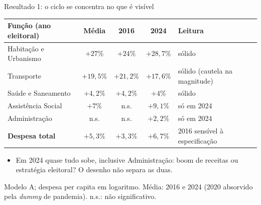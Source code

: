 \documentclass[aspectratio=169,9pt]{beamer}
\begin{document}
\begin{frame}{Resultado 1: o ciclo se concentra no que é visível}
  \begin{center}
    \begin{tabular}{lcccl}
      \toprule
      \textbf{Função (ano eleitoral)} & \textbf{Média} & \textbf{2016} & \textbf{2024} & \textbf{Leitura}\\
      \midrule
      Habitação e Urbanismo & $+27\%$     & $+24\%$     & $+28{,}7\%$ & sólido \\
      Transporte            & $+19{,}5\%$ & $+21{,}2\%$ & $+17{,}6\%$ & sólido (cautela na magnitude) \\
      Saúde e Saneamento    & $+4{,}2\%$  & $+4{,}2\%$  & $+4\%$      & sólido \\
      Assistência Social    & $+7\%$      & n.s.        & $+9{,}1\%$  & só em 2024 \\
      Administração         & n.s.        & n.s.        & $+2{,}2\%$  & só em 2024 \\
      \midrule
      \textbf{Despesa total} & {\boldmath$+5{,}3\%$} & $+3{,}3\%$ & $+6{,}7\%$ & 2016 sensível à especificação \\
      \bottomrule
    \end{tabular}
  \end{center}
  \vspace{0.3em}
  \begin{itemize}
    \item Em 2024 quase tudo sobe, inclusive Administração: boom de receitas ou estratégia eleitoral? O desenho não separa as duas.
  \end{itemize}
  \vfill
  {\scriptsize Modelo A; despesa per capita em logaritmo. Média: 2016 e 2024 (2020 absorvido pela \textit{dummy} de pandemia). n.s.: não significativo.}
\end{frame}
\end{document}
